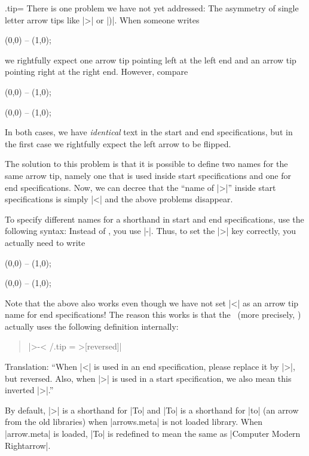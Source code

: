 \begin{handler}{{.tip}{=}}
  There is one problem we have not yet addressed: The asymmetry of
  single letter arrow tips like |>| or |)|. When someone writes 
\begin{codeexample}[]
\tikz \draw [<->] (0,0) -- (1,0);  
\end{codeexample}
  we rightfully expect one arrow tip pointing left at the left end and
  an arrow tip pointing right at the right end. However, compare 
\begin{codeexample}[]
\tikz \draw [>->] (0,0) -- (1,0);  
\end{codeexample}
\begin{codeexample}[]
\tikz {} (0,0) -- (1,0);  
\end{codeexample}
  In both cases, we have \emph{identical} text in the start and end
  specifications, but in the first case we rightfully expect the left
  arrow to be flipped.

  The solution to this problem is that it is possible to define
  two names for the same arrow tip, namely one that is used inside
  start specifications and one for end specifications. Now, we can
  decree that the ``name of |>|'' inside start specifications is
  simply |<| and the above problems disappear.
  
  To specify different names for a shorthand in start and end
  specifications, use the following syntax: Instead of , you
  use |-|. Thus, to set the |>| key correctly, you actually
  need to write
\begin{codeexample}[]
\tikz [<-> /.tip = Stealth] \draw [<->>] (0,0) -- (1,0);  
\end{codeexample}
\begin{codeexample}[]
\tikz [<-> /.tip = Latex] \draw [>-<] (0,0) -- (1,0);  
\end{codeexample}

  Note that the above also works even though we have not set |<| as an
  arrow tip name for end specifications! The reason this works is that
  the \tikzname\ (more precisely, \pgfname) actually uses the
  following definition internally: 
  \begin{quote}
    |>-< /.tip = >[reversed]|
  \end{quote}
  Translation: ``When |<| is used in an end specification, please
  replace it by |>|, but reversed. Also, when |>| is used in a start
  specification, we also mean this inverted |>|.''
  
  By default, |>| is a shorthand for |To| and |To| is a shorthand for
  |to| (an arrow from the old libraries) when |arrows.meta| is not
  loaded library. When |arrow.meta| is loaded, |To| is redefined to
  mean the same as 
  |Computer Modern Rightarrow|.
\end{handler}

